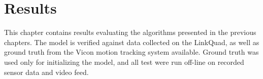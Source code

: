 \chapter{Results}
\label{cha:results}
    This chapter contains results evaluating the algorithms presented in the previous chapters.
    The model is verified against data collected on the LinkQuad, as well
    as ground truth from the Vicon motion tracking system available.
    Ground truth was used only for initializing the model, and all test
    were run off-line on recorded sensor data and video feed.

    
    
    
    



